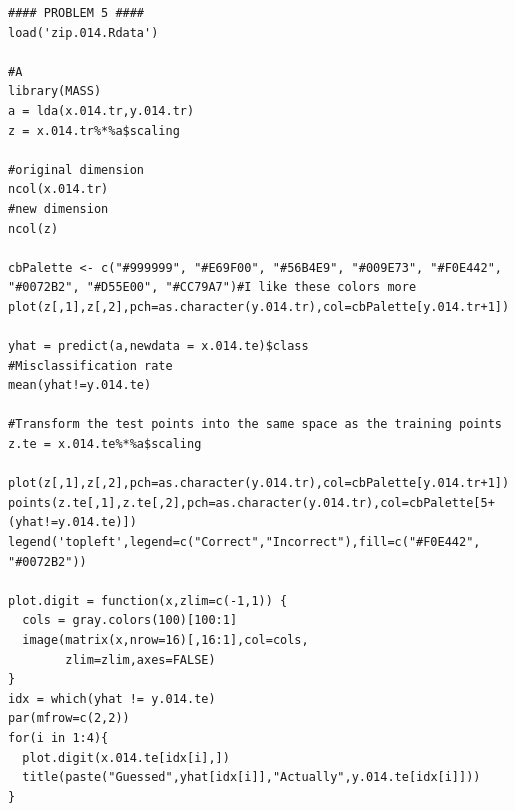 \documentclass[12pt]{article}
\newcommand{\1}{\mathbbm{1}}
\begin{document}
\begin{verbatim}
#### PROBLEM 5 ####
load('zip.014.Rdata')

#A
library(MASS)
a = lda(x.014.tr,y.014.tr)
z = x.014.tr%*%a$scaling

#original dimension
ncol(x.014.tr)
#new dimension
ncol(z)

cbPalette <- c("#999999", "#E69F00", "#56B4E9", "#009E73", "#F0E442", "#0072B2", "#D55E00", "#CC79A7")#I like these colors more
plot(z[,1],z[,2],pch=as.character(y.014.tr),col=cbPalette[y.014.tr+1])

yhat = predict(a,newdata = x.014.te)$class
#Misclassification rate
mean(yhat!=y.014.te)

#Transform the test points into the same space as the training points
z.te = x.014.te%*%a$scaling

plot(z[,1],z[,2],pch=as.character(y.014.tr),col=cbPalette[y.014.tr+1])
points(z.te[,1],z.te[,2],pch=as.character(y.014.tr),col=cbPalette[5+(yhat!=y.014.te)])
legend('topleft',legend=c("Correct","Incorrect"),fill=c("#F0E442", "#0072B2"))

plot.digit = function(x,zlim=c(-1,1)) {
  cols = gray.colors(100)[100:1]
  image(matrix(x,nrow=16)[,16:1],col=cols,
        zlim=zlim,axes=FALSE)  
}
idx = which(yhat != y.014.te)
par(mfrow=c(2,2))
for(i in 1:4){
  plot.digit(x.014.te[idx[i],])
  title(paste("Guessed",yhat[idx[i]],"Actually",y.014.te[idx[i]]))
}
\end{verbatim}

%
%
\end{document}
